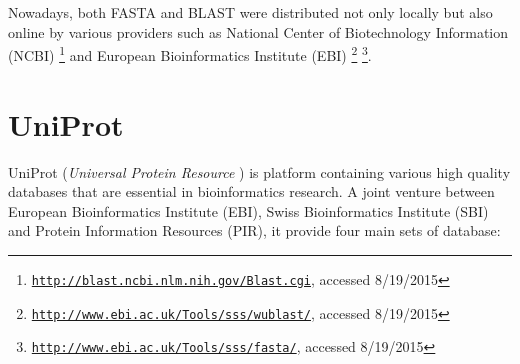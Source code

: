 Nowadays, both FASTA and BLAST were distributed not only locally but also online by various providers such as National Center of Biotechnology Information (NCBI) \footnote{\href{http://blast.ncbi.nlm.nih.gov/Blast.cgi}{\texttt{http://blast.ncbi.nlm.nih.gov/Blast.cgi}}, accessed 8/19/2015} and European Bioinformatics Institute (EBI) \footnote{\href{http://www.ebi.ac.uk/Tools/sss/wublast/}{\texttt{http://www.ebi.ac.uk/Tools/sss/wublast/}}, accessed 8/19/2015} \footnote{\href{http://www.ebi.ac.uk/Tools/sss/fasta/}{\texttt{http://www.ebi.ac.uk/Tools/sss/fasta/}}, accessed 8/19/2015}.


\section{UniProt}

UniProt (\textit{Universal Protein Resource} \citep{uniprot2008universal}) is platform containing various high quality databases that are essential in bioinformatics research. A joint venture between European Bioinformatics Institute (EBI), Swiss Bioinformatics Institute (SBI) and Protein Information Resources (PIR), it provide four main sets of database: 

